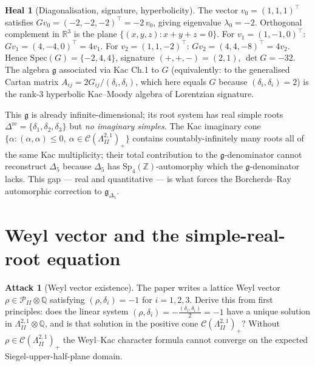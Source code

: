 \documentclass[11pt]{article}
\theoremstyle{definition}
\newtheorem{attack}[theorem]{Attack}
\newtheorem{heal}[theorem]{Heal}
\providecommand{\Z}{\mathbb{Z}}
\providecommand{\Q}{\mathbb{Q}}
\providecommand{\R}{\mathbb{R}}
\providecommand{\g}{\mathfrak{g}}
\providecommand{\Sp}{\mathrm{Sp}}
\providecommand{\LII}{\Lambda^{2,1}_{I\!I}}
\providecommand{\PII}{\mathcal{P}_{I\!I}}
\providecommand{\CII}{\mathcal{C}(\LII)_+}
\providecommand{\dre}{\Delta^{\mathrm{re}}}
\providecommand{\Deltafive}{\Delta_5}
\begin{document}
\begin{heal}[Diagonalisation, signature, hyperbolicity]
\label{heal:cartan-signature}
The vector $v_0=(1,1,1)^\top$ satisfies $G v_0=(-2,-2,-2)^\top=-2\,v_0$,
giving eigenvalue $\lambda_0=-2$. Orthogonal complement in $\R^3$ is the
plane $\{(x,y,z):x+y+z=0\}$. For $v_1=(1,-1,0)^\top$:
$Gv_1=(4,-4,0)^\top=4v_1$. For $v_2=(1,1,-2)^\top$:
$Gv_2=(4,4,-8)^\top=4v_2$. Hence $\mathrm{Spec}(G)=\{-2,4,4\}$, signature
$(+,+,-)=(2,1)$, $\det G = -32$. The algebra $\g$ associated via Kac Ch.1
to $G$ (equivalently: to the generalised Cartan matrix
$A_{ij}=2G_{ij}/(\delta_i,\delta_i)$, which here equals $G$ because
$(\delta_i,\delta_i)=2$) is the rank-$3$ hyperbolic Kac--Moody algebra
of Lorentzian signature.

This $\g$ is already infinite-dimensional; its root system has real
simple roots $\dre=\{\delta_1,\delta_2,\delta_3\}$ but \emph{no
imaginary simples}. The Kac imaginary cone
$\{\alpha:(\alpha,\alpha)\le 0,\ \alpha\in\CII\}$ contains
countably-infinitely many roots all of the same Kac multiplicity; their
total contribution to the $\g$-denominator cannot reconstruct
$\Deltafive$ because $\Deltafive$ has $\Sp_4(\Z)$-automorphy which the
$\g$-denominator lacks. This gap --- real and quantitative --- is what
forces the Borcherds--Ray automorphic correction to $\g_{\Deltafive}$.
\end{heal}

\section{Weyl vector and the simple-real-root equation}

\begin{attack}[Weyl vector existence]
\label{att:weyl-vector}
The paper writes a lattice Weyl vector
$\rho\in\PII\otimes\Q$ satisfying $(\rho,\delta_i)=-1$ for
$i=1,2,3$. Derive this from first principles: does the linear system
$(\rho,\delta_i)=-\tfrac{(\delta_i,\delta_i)}{2}=-1$ have a unique
solution in $\LII\otimes\Q$, and is that solution in the positive cone
$\CII$? Without $\rho\in\CII$ the Weyl--Kac character formula cannot
converge on the expected Siegel-upper-half-plane domain.
\end{attack}
\end{document}
